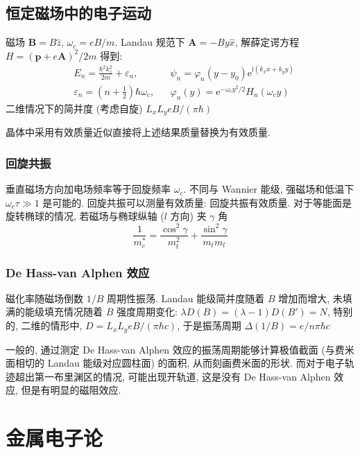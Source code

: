 \documentclass[11pt,a4paper]{article}%
\numberwithin{equation}{section}%
\renewcommand*{\vec}[1]{\bm{#1}}%
\newcommand\mi{\mathrm{i}}
\newcommand\e{\mathrm{e}}%
\begin{document}
\subsection{恒定磁场中的电子运动} %
\label{sub:e_in_mag}
磁场 $\vec B = B\hat z$, $\omega_c = eB/m$. Landau 规范下 $\vec A = -By\hat x$, 解薛定谔方程 $H = (\vec p + e\vec A)^2/2m $ 得到:
\begin{align}
	&E_n = \frac{\hbar^2k_z^2}{2m} + \varepsilon_n,
	&&\psi_n = \varphi_n(y - y_0)\e^{\mi(k_xx+k_yy)} \\
	&\varepsilon_n = \left(n+\frac 12\right)\hbar\omega_c,
	&&\varphi_n(y) = \e^{-\omega_cy^2/2}H_n(\omega_c y)
\end{align}
二维情况下的简并度 (考虑自旋) $L_xL_y eB/(\pi\hbar)$

晶体中采用有效质量近似直接将上述结果质量替换为有效质量.
\subsubsection{回旋共振} %
\label{ssub:cyc_resonance}
垂直磁场方向加电场频率等于回旋频率 $\omega_c$. 不同与 Wannier 能级, 强磁场和低温下 $\omega_c\tau\gg 1$ 是可能的. 回旋共振可以测量有效质量: 回旋共振有效质量. 对于等能面是旋转椭球的情况, 若磁场与椭球纵轴 ($l$ 方向) 夹 $\gamma$ 角
\begin{equation}
	\frac 1{m_c^*} = \frac{\cos^2\gamma}{m_t^2} + \frac{\sin^2\gamma}{m_tm_l}
\end{equation}
\subsubsection{De Hass-van Alphen 效应} %
\label{ssub:de_hass_van_alphen}
磁化率随磁场倒数 $1/B$ 周期性振荡. Landau 能级简并度随着 $B$ 增加而增大, 未填满的能级填充情况随着 $B$ 强度周期变化: $\lambda D(B) = (\lambda - 1) D(B') = N$, 特别的, 二维的情形中, $D = L_xL_y eB/(\pi\hbar c)$, 于是振荡周期 $\Delta(1/B) = e/n\pi\hbar c$

一般的, 通过测定 De Hass-van Alphen 效应的振荡周期能够计算极值截面 (与费米面相切的 Landau 能级对应圆柱面) 的面积, 从而刻画费米面的形状. 而对于电子轨迹超出第一布里渊区的情况, 可能出现开轨道, 这是没有 De Hass-van Alphen 效应, 但是有明显的磁阻效应.
\section{金属电子论} %
\label{sec:e_in_metal}
\end{document}
